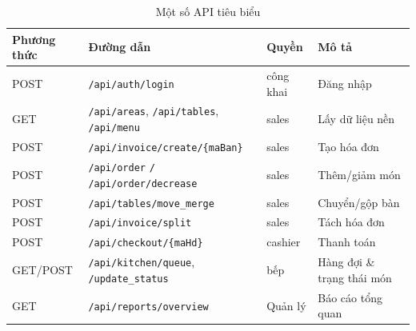\documentclass[12pt,a4paper]{report}
\newcommand{\code}[1]{\texttt{#1}}
\begin{document}
\begin{table}[H]
\centering
\caption{Một số API tiêu biểu}
\begin{tabularx}{\textwidth}{L{2cm} L{5.5cm} L{1.8cm} X}
\toprule
\textbf{Phương thức} & \textbf{Đường dẫn} & \textbf{Quyền} & \textbf{Mô tả} \\
\midrule
POST & \code{/api/auth/login} & công khai & Đăng nhập \\
GET & \code{/api/areas}, \code{/api/tables}, \code{/api/menu} & sales & Lấy dữ liệu nền \\
POST & \code{/api/invoice/create/\{maBan\}} & sales & Tạo hóa đơn \\
POST & \code{/api/order} \texttt{/} \code{/api/order/decrease} & sales & Thêm/giảm món \\
POST & \code{/api/tables/move\_merge} & sales & Chuyển/gộp bàn \\
POST & \code{/api/invoice/split} & sales & Tách hóa đơn \\
POST & \code{/api/checkout/\{maHd\}} & cashier & Thanh toán \\
GET/POST & \code{/api/kitchen/queue}, \code{/update\_status} & bếp & Hàng đợi \& trạng thái món \\
GET & \code{/api/reports/overview} & Quản lý & Báo cáo tổng quan \\
\bottomrule
\end{tabularx}
\end{table}
\end{document}
